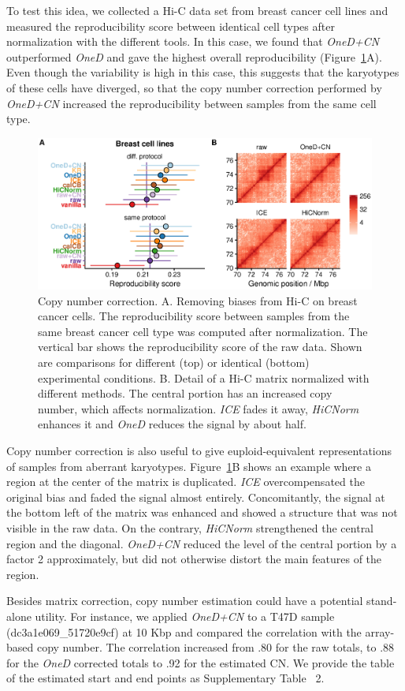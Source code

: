 \documentclass[a4,center,fleqn]{NAR}
\begin{document}
To test this idea, we collected a Hi-C data set from breast cancer cell
lines and measured the reproducibility score between identical cell types
after normalization with the different tools. In this case, we found that
\textit{OneD+CN} outperformed \textit{OneD} and gave the highest overall
reproducibility (Figure~\ref{fig:cnv_correction}A). Even though the
variability is high in this case, this suggests that the karyotypes of
these cells have diverged, so that the copy number correction performed by
\textit{OneD+CN} increased the reproducibility between samples from the same
cell type.

\begin{figure}
\centerline{\includegraphics[width=.49\textwidth]
  {nar_figures/figure_4.eps}}
\caption{Copy number correction. A. Removing biases from Hi-C on breast
cancer cells. The reproducibility score between samples from the same
breast cancer cell type was computed after normalization. The vertical bar
shows the reproducibility score of the raw data. Shown are comparisons for
different (top) or identical (bottom) experimental conditions. B. Detail
of a Hi-C matrix normalized with different methods. The central portion
has an increased copy number, which affects normalization. \textit{ICE}
fades it away, \textit{HiCNorm} enhances it and \textit{OneD} reduces the
signal by about half.}
\label{fig:cnv_correction}
\end{figure}

Copy number correction is also useful to give euploid-equivalent
representations of samples from aberrant karyotypes.
Figure~\ref{fig:cnv_correction}B shows an example where a region at the
center of the matrix is duplicated. \textit{ICE} overcompensated the
original bias and faded the signal almost entirely. Concomitantly, the
signal at the bottom left of the matrix was enhanced and showed a
structure that was not visible in the raw data. On the contrary,
\textit{HiCNorm} strengthened the central region and the diagonal.
\textit{OneD+CN} reduced the level of the central portion by a factor 2
approximately, but did not otherwise distort the main features of the
region.

Besides matrix correction, copy number estimation could have a potential stand-alone
utility. For instance, we applied \textit{OneD+CN} to a T47D sample
(dc3a1e069\_51720e9cf) at 10 Kbp and compared the correlation with the
array-based copy number. The correlation increased from .80 for the raw totals,
to .88 for the \textit{OneD} corrected totals to .92 for the estimated CN. We
provide the table of the estimated start and end points as Supplementary Table~
2.
\end{document}
